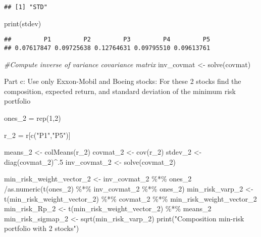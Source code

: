 \documentclass[
]{article}
\newenvironment{Shaded}{\begin{snugshade}}{\end{snugshade}}
\newcommand{\CommentTok}[1]{\textcolor[rgb]{0.56,0.35,0.01}{\textit{#1}}}
\newcommand{\DecValTok}[1]{\textcolor[rgb]{0.00,0.00,0.81}{#1}}
\newcommand{\FunctionTok}[1]{\textcolor[rgb]{0.00,0.00,0.00}{#1}}
\newcommand{\NormalTok}[1]{#1}
\newcommand{\OtherTok}[1]{\textcolor[rgb]{0.56,0.35,0.01}{#1}}
\newcommand{\SpecialCharTok}[1]{\textcolor[rgb]{0.00,0.00,0.00}{#1}}
\newcommand{\StringTok}[1]{\textcolor[rgb]{0.31,0.60,0.02}{#1}}
\begin{document}
\begin{verbatim}
## [1] "STD"
\end{verbatim}

\begin{Shaded}
\begin{Highlighting}[]
\FunctionTok{print}\NormalTok{(stdev)}
\end{Highlighting}
\end{Shaded}

\begin{verbatim}
##         P1         P2         P3         P4         P5 
## 0.07617847 0.09725638 0.12764631 0.09795510 0.09613761
\end{verbatim}

\begin{Shaded}
\begin{Highlighting}[]
\CommentTok{\#Compute inverse of variance covariance matrix }
\NormalTok{inv\_covmat }\OtherTok{\textless{}{-}} \FunctionTok{solve}\NormalTok{(covmat)}
\end{Highlighting}
\end{Shaded}

Part c: Use only Exxon-Mobil and Boeing stocks: For these 2 stocks find
the composition, expected return, and standard deviation of the minimum
risk portfolio

\begin{Shaded}
\begin{Highlighting}[]
\NormalTok{ones\_2 }\OtherTok{=} \FunctionTok{rep}\NormalTok{(}\DecValTok{1}\NormalTok{,}\DecValTok{2}\NormalTok{)}

\NormalTok{r\_2 }\OtherTok{=}\NormalTok{ r[}\FunctionTok{c}\NormalTok{(}\StringTok{"P1"}\NormalTok{,}\StringTok{"P5"}\NormalTok{)]}

\NormalTok{means\_2 }\OtherTok{\textless{}{-}} \FunctionTok{colMeans}\NormalTok{(r\_2)}
\NormalTok{covmat\_2 }\OtherTok{\textless{}{-}} \FunctionTok{cov}\NormalTok{(r\_2)}
\NormalTok{stdev\_2 }\OtherTok{\textless{}{-}} \FunctionTok{diag}\NormalTok{(covmat\_2)}\SpecialCharTok{\^{}}\NormalTok{.}\DecValTok{5}
\NormalTok{inv\_covmat\_2 }\OtherTok{\textless{}{-}} \FunctionTok{solve}\NormalTok{(covmat\_2)}

\NormalTok{min\_risk\_weight\_vector\_2 }\OtherTok{\textless{}{-}}\NormalTok{ inv\_covmat\_2  }\SpecialCharTok{\%*\%}\NormalTok{ ones\_2 }\SpecialCharTok{/}\FunctionTok{as.numeric}\NormalTok{(}\FunctionTok{t}\NormalTok{(ones\_2)  }\SpecialCharTok{\%*\%}\NormalTok{  inv\_covmat\_2 }\SpecialCharTok{\%*\%}\NormalTok{ ones\_2) }
\NormalTok{min\_risk\_varp\_2 }\OtherTok{\textless{}{-}} \FunctionTok{t}\NormalTok{(min\_risk\_weight\_vector\_2) }\SpecialCharTok{\%*\%}\NormalTok{ covmat\_2 }\SpecialCharTok{\%*\%}\NormalTok{ min\_risk\_weight\_vector\_2 }
\NormalTok{min\_risk\_Rp\_2 }\OtherTok{\textless{}{-}} \FunctionTok{t}\NormalTok{(min\_risk\_weight\_vector\_2) }\SpecialCharTok{\%*\%}\NormalTok{ means\_2 }
\NormalTok{min\_risk\_sigmap\_2 }\OtherTok{\textless{}{-}} \FunctionTok{sqrt}\NormalTok{(min\_risk\_varp\_2)}
\FunctionTok{print}\NormalTok{(}\StringTok{"Composition min{-}risk portfolio with 2 stocks"}\NormalTok{)}
\end{Highlighting}
\end{Shaded}
\end{document}
